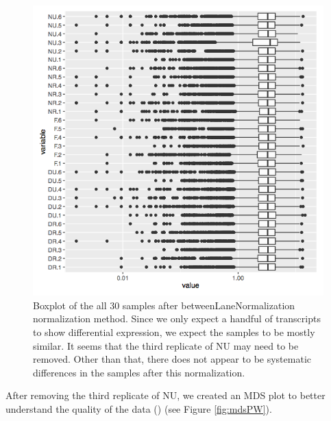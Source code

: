 \documentclass[11pt,a4paper,oldfontcommands,openany]{memoir}
\numberwithin{equation}{section} %
\begin{document}
\begin{figure}[H]
    \begin{framed}
    \centering
    \includegraphics[width=\textwidth]{boxplotPW}
    \end{framed}
    \caption{Boxplot of the all 30 samples after betweenLaneNormalization normalization method. Since we only expect a handful of transcripts to show differential expression, we expect the samples to be mostly similar. It seems that the third replicate of NU may need to be removed. Other than that, there does not appear to be systematic differences in the samples after this normalization.}
    \label{fig:boxplotPW}
\end{figure}

After removing the third replicate of NU, we created an MDS plot to better understand the quality of the data (\citealt{limma}) (see Figure \ref{fig:mdsPW}).

\clearpage
\end{document}
